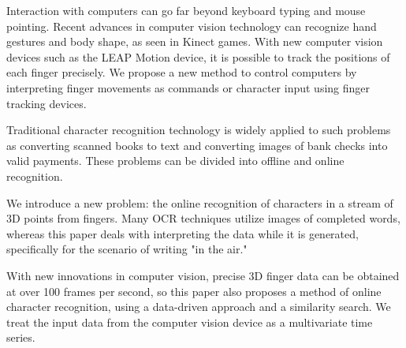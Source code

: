 Interaction with computers can go far beyond keyboard typing and mouse pointing. Recent advances in computer vision technology can recognize hand gestures and body shape, as seen in Kinect games. With new computer vision devices such as the LEAP Motion device, it is possible to track the positions of each finger precisely. We propose a new method to control computers by interpreting finger movements as commands or character input using finger tracking devices. 

Traditional character recognition technology is widely applied to such problems as converting scanned books to text and converting images of bank checks into valid payments. These problems can be divided into offline and online recognition. 

We introduce a new problem: the online recognition of characters in a stream of 3D points from fingers. Many OCR techniques utilize images of completed words, whereas this paper deals with interpreting the data while it is generated, specifically for the scenario of writing "in the air."  

With new innovations in computer vision, precise 3D finger data can be obtained at over 100 frames per second, so this paper also proposes a method of online character recognition, using a data-driven approach and a similarity search. We treat the input data from the computer vision device as a multivariate time series.

